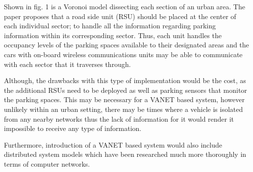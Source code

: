 Shown in fig. 1 is a Voronoi model dissecting each section of an urban area. The paper proposes that a road side unit (RSU) should be placed at the center of each individual sector; to handle all the information regarding parking information within its corresponding sector. Thus, each unit handles the occupancy levels of the parking spaces available to their designated areas and the cars with on-board wireless communications units may be able to communicate with each sector that it traverses through.

Although, the drawbacks with this type of implementation would be the cost, as the additional RSUs need to be deployed as well as parking sensors that monitor the parking spaces. This may be necessary for a VANET based system, however unlikely within an urban setting, there may be times where a vehicle is isolated from any nearby networks thus the lack of information for it would render it impossible to receive any type of information.

Furthermore, introduction of a VANET based system would also include distributed system models which have been researched much more thoroughly in terms of computer networks.